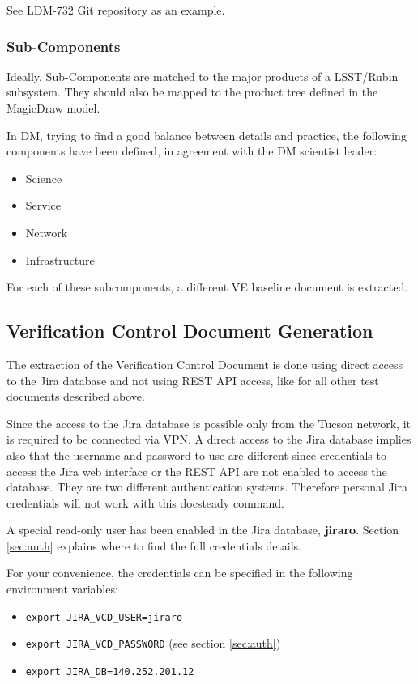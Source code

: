 \documentclass[DM]{lsstdoc}
\begin{document}
See LDM-732 Git repository as an example.


\subsubsection{Sub-Components}\label{sec:subcomp}

Ideally, Sub-Components are matched to the major products of a LSST/Rubin subsystem. 
They should also be mapped to the product tree defined in the MagicDraw model.

In DM, trying to find a good balance between details and practice, the following components have been defined, in agreement with the DM scientist leader:

\begin{itemize}
\item Science
\item Service
\item Network
\item Infrastructure
\end{itemize}

For each of these subcomponents, a different VE baseline document is extracted.



\subsection{Verification Control Document Generation}

The extraction of the Verification Control Document is done using direct access to the Jira database and not using REST API access, like for all other test documents described above.

Since the access to the Jira database is possible only from the Tucson network, it is required to be connected via VPN.
A direct access to the Jira database implies also that the username and password to use are different since credentials to access the Jira web interface or the REST API are not enabled to access the database. They are two different authentication systems.
Therefore personal Jira credentials will not work with this docsteady command.

A special read-only user has been enabled in the Jira database, \textbf{jiraro}.
Section \ref{sec:auth} explains where to find the full credentials details.

For your convenience, the credentials can be specified in the following environment variables:

\begin{itemize}
\item \texttt{export JIRA\_VCD\_USER=jiraro}
\item \texttt{export JIRA\_VCD\_PASSWORD} (see section \ref{sec:auth})
\item \texttt{export JIRA\_DB=140.252.201.12}
\end{itemize}
\end{document}
